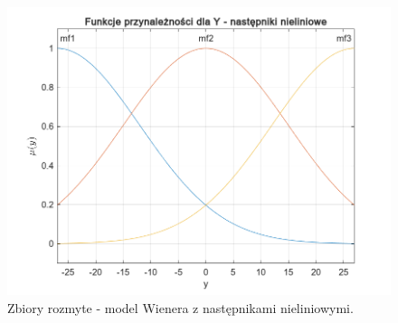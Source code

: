 \begin{figure}[h!]
\centering
\includegraphics[width=\textwidth]{pictures/WienerfuzzySets_nieliniowe}
\caption{Zbiory rozmyte - model Wienera z następnikami nieliniowymi.}
\end{figure}